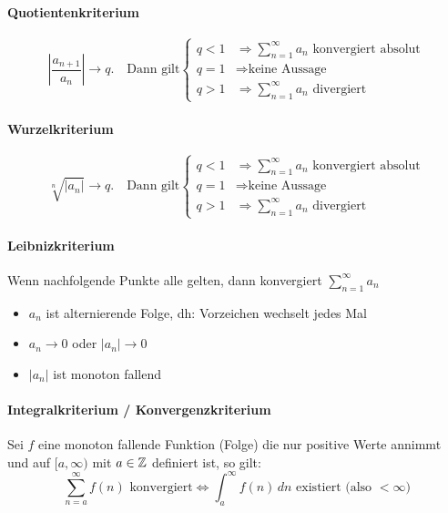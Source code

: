 \paragraph{Quotientenkriterium}
\[
\left| \frac{a_{n+1}}{a_n} \right| \to q. \quad \text{Dann gilt} \begin{cases}
q < 1 & \Rightarrow \sum_{n=1}^\infty a_n \text{ konvergiert absolut} \\
q = 1 & \Rightarrow \text{keine Aussage}\\
q > 1 & \Rightarrow \sum_{n=1}^\infty a_n \text{ divergiert}
\end{cases}
\]

\paragraph{Wurzelkriterium}
\[
\sqrt[n]{\left | a_n \right |} \to q. \quad \text{Dann gilt} \begin{cases}
q < 1 & \Rightarrow \sum_{n=1}^\infty a_n \text{ konvergiert absolut}\\
q = 1 & \Rightarrow \text{keine Aussage}\\
q > 1 & \Rightarrow \sum_{n=1}^\infty a_n \text{ divergiert}
\end{cases}
\]

\paragraph{Leibnizkriterium}
\vspace{-0.3cm}
{\small
Wenn nachfolgende Punkte alle gelten, dann konvergiert $\sum_{n=1}^\infty a_n$}
\begin{itemize}[leftmargin=0.5cm]
  \item $a_n$ ist alternierende Folge, dh: Vorzeichen wechselt jedes Mal
  \item $a_n \to 0$ oder $|a_n| \to 0$
  \item $|a_n|$ ist monoton fallend
\end{itemize}

\paragraph{Integralkriterium / Konvergenzkriterium}
\vspace{-0.2cm}
Sei $f$ eine monoton fallende Funktion (Folge) die nur positive Werte annimmt und auf $[a, \infty)$ mit $a \in \mathbb{Z}$ definiert ist, so gilt:
\[
	\sum_{n = a}^{\infty} f(n) \text{ konvergiert} \Leftrightarrow \int_a^{\infty} f(n) \, dn 
	\text{ existiert (also $< \infty$)}
\] 

